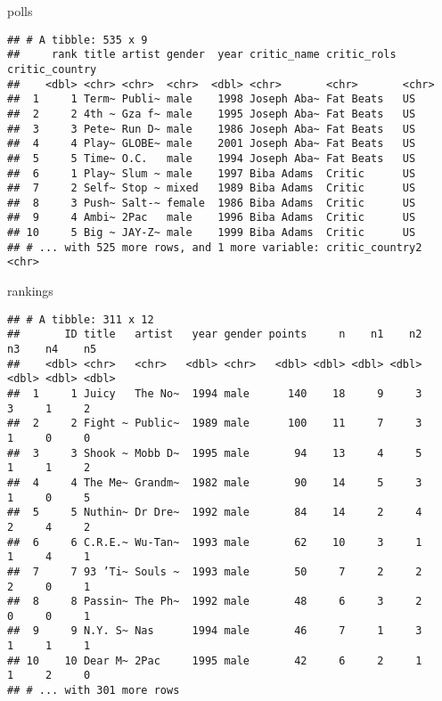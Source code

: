 \documentclass[
]{article}
\newenvironment{Shaded}{\begin{snugshade}}{\end{snugshade}}
\newcommand{\NormalTok}[1]{#1}
\begin{document}
\begin{Shaded}
\begin{Highlighting}[]
\NormalTok{polls}
\end{Highlighting}
\end{Shaded}

\begin{verbatim}
## # A tibble: 535 x 9
##     rank title artist gender  year critic_name critic_rols critic_country
##    <dbl> <chr> <chr>  <chr>  <dbl> <chr>       <chr>       <chr>         
##  1     1 Term~ Publi~ male    1998 Joseph Aba~ Fat Beats   US            
##  2     2 4th ~ Gza f~ male    1995 Joseph Aba~ Fat Beats   US            
##  3     3 Pete~ Run D~ male    1986 Joseph Aba~ Fat Beats   US            
##  4     4 Play~ GLOBE~ male    2001 Joseph Aba~ Fat Beats   US            
##  5     5 Time~ O.C.   male    1994 Joseph Aba~ Fat Beats   US            
##  6     1 Play~ Slum ~ male    1997 Biba Adams  Critic      US            
##  7     2 Self~ Stop ~ mixed   1989 Biba Adams  Critic      US            
##  8     3 Push~ Salt-~ female  1986 Biba Adams  Critic      US            
##  9     4 Ambi~ 2Pac   male    1996 Biba Adams  Critic      US            
## 10     5 Big ~ JAY-Z~ male    1999 Biba Adams  Critic      US            
## # ... with 525 more rows, and 1 more variable: critic_country2 <chr>
\end{verbatim}

\begin{Shaded}
\begin{Highlighting}[]
\NormalTok{rankings}
\end{Highlighting}
\end{Shaded}

\begin{verbatim}
## # A tibble: 311 x 12
##       ID title   artist   year gender points     n    n1    n2    n3    n4    n5
##    <dbl> <chr>   <chr>   <dbl> <chr>   <dbl> <dbl> <dbl> <dbl> <dbl> <dbl> <dbl>
##  1     1 Juicy   The No~  1994 male      140    18     9     3     3     1     2
##  2     2 Fight ~ Public~  1989 male      100    11     7     3     1     0     0
##  3     3 Shook ~ Mobb D~  1995 male       94    13     4     5     1     1     2
##  4     4 The Me~ Grandm~  1982 male       90    14     5     3     1     0     5
##  5     5 Nuthin~ Dr Dre~  1992 male       84    14     2     4     2     4     2
##  6     6 C.R.E.~ Wu-Tan~  1993 male       62    10     3     1     1     4     1
##  7     7 93 ’Ti~ Souls ~  1993 male       50     7     2     2     2     0     1
##  8     8 Passin~ The Ph~  1992 male       48     6     3     2     0     0     1
##  9     9 N.Y. S~ Nas      1994 male       46     7     1     3     1     1     1
## 10    10 Dear M~ 2Pac     1995 male       42     6     2     1     1     2     0
## # ... with 301 more rows
\end{verbatim}
\end{document}
